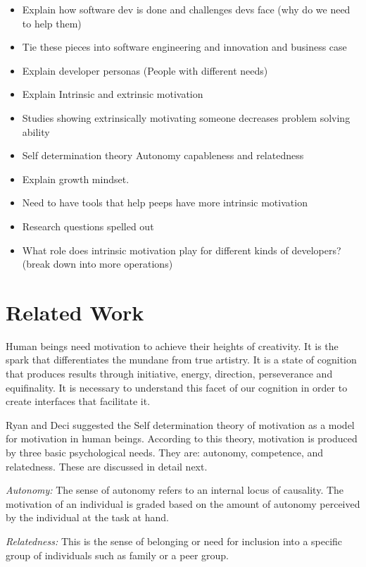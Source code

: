 \documentclass[conference]{IEEEtran}
\begin{document}
\begin{itemize}
\item
  Explain how software dev is done and challenges devs face (why do we
  need to help them)
\item
  Tie these pieces into software engineering and innovation and business
  case
\item
  Explain developer personas (People with different needs)
\item
  Explain Intrinsic and extrinsic motivation
\item
  Studies showing extrinsically motivating someone decreases problem
  solving ability
\item
  Self determination theory Autonomy capableness and relatedness
\item
  Explain growth mindset.
\item
  Need to have tools that help peeps have more intrinsic motivation
\item
  Research questions spelled out
\item
  What role does intrinsic motivation play for different kinds of
  developers? (break down into more operations)
\end{itemize}

\section{Related Work}

Human beings need motivation to achieve their heights of creativity. It
is the spark that differentiates the mundane from true artistry. It is a
state of cognition that produces results through initiative, energy,
direction, perseverance and equifinality. It is necessary to understand
this facet of our cognition in order to create interfaces that
facilitate it.

Ryan and Deci suggested the Self determination theory of
motivation\cite{ryan2000self} as a model for motivation in human
beings. According to this theory, motivation is produced by three basic
psychological needs. They are: autonomy, competence, and relatedness.
These are discussed in detail next.

\emph{Autonomy:} The sense of autonomy refers to an internal locus of
causality. The motivation of an individual is graded based on the amount
of autonomy perceived by the individual at the task at hand.

\emph{Relatedness:} This is the sense of belonging or need for inclusion
into a specific group of individuals such as family or a peer group.
\end{document}
